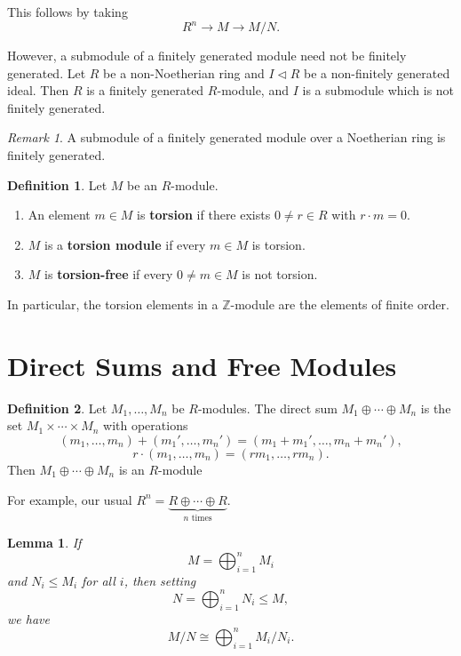 \documentclass[12pt]{article}
\newtheorem{lemma}{Lemma}[section]
\theoremstyle{definition}
\newtheorem{definition}{Definition}[section]
\theoremstyle{remark}
\newtheorem*{remark}{Remark}
\begin{document}
This follows by taking 
\[
R^{n} \to M \to M/N
.\]

However, a submodule of a finitely generated module need not be finitely generated. Let $R$ be a non-Noetherian ring and $I \lhd R$ be a non-finitely generated ideal. Then $R$ is a finitely generated $R$-module, and $I$ is a submodule which is not finitely generated.

\begin{remark}
	A submodule of a finitely generated module over a Noetherian ring is finitely generated.
\end{remark}

\begin{definition}
	Let $M$ be an $R$-module.
	\begin{enumerate}[label = (\roman*)]
		\item An element $m \in M$ is \textbf{torsion} if there exists $0 \neq r \in R$ with $r \cdot m = 0$.
		\item $M$ is a \textbf{torsion module} if every $m \in M$ is torsion.
		\item $M$ is \textbf{torsion-free} if every $0 \neq m \in M$ is not torsion.
	\end{enumerate}
\end{definition}

In particular, the torsion elements in a $\mathbb{Z}$-module are the elements of finite order.

\newpage

\section{Direct Sums and Free Modules}%
\label{sec:direct_sums_and_free_modules}

\begin{definition}
	Let $M_1, \ldots, M_n$ be $R$-modules. The direct sum $M_1 \oplus \cdots \oplus M_n$ is the set $M_1 \times \cdots \times M_n$ with operations
	\[
		(m_1, \ldots, m_n) + (m_1', \ldots, m_n') = (m_1 + m_1', \ldots, m_n + m_n')
	,\]
	\[
		r \cdot (m_1, \ldots, m_n) = (r m_1, \ldots, rm_n)
	.\]
	Then $M_1 \oplus \cdots \oplus M_n$ is an $R$-module
\end{definition}

For example, our usual $R^{n} = \underbrace{R \oplus \cdots \oplus R}_{n \text{ times}}$.

\begin{lemma} 
	If
	\[
	M = \bigoplus_{i = 1}^{n} M_i
	\]
	and $N_i \leq M_i$ for all $i$, then setting
	\[
	N = \bigoplus_{i = 1}^{n} N_i \leq M
	,\]
	we have
	\[
	M / N \cong \bigoplus_{i = 1}^{n} M_i / N_i
	.\]
\end{lemma}
\end{document}
